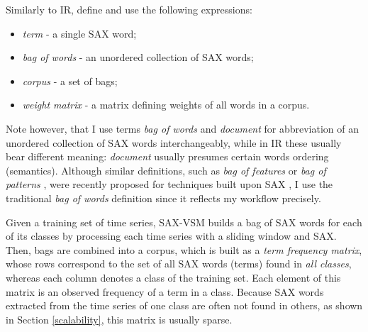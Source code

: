 Similarly to IR, define and use the following expressions:
\begin{itemize}
  \item \textit{term} - a single SAX word;
  \item \textit{bag of words} - an unordered collection of SAX words;
  \item \textit{corpus} - a set of bags;
  \item \textit{weight matrix} - a matrix defining weights of all words in a corpus.
\end{itemize}
Note however, that I use terms \textit{bag of words} and \textit{document} for abbreviation of an unordered 
collection of SAX words interchangeably, while in IR these usually bear different meaning: \textit{document} 
usually presumes certain words ordering (semantics). 
Although similar definitions, such as \textit{bag of features} \cite{citeulike:12636726} 
or \textit{bag of patterns} \cite{citeulike:10525778}, were recently proposed for techniques built 
upon SAX \cite{citeulike:10525778}, I use the traditional \textit{bag of words} definition since it reflects 
my workflow precisely. 

Given a training set of time series, SAX-VSM builds a bag of SAX words for each of its classes by processing 
each time series with a sliding window and SAX. Then, bags are combined into a corpus, which is built as a 
\textit{term frequency matrix}, whose rows correspond to the set of all SAX words (terms) 
found in \textit{all classes}, whereas each column denotes a class of the training set. 
Each element of this matrix is an observed frequency of a term in a class. 
Because SAX words extracted from the time series of one class are often not 
found in others, as shown in Section \ref{scalability}, this matrix is usually sparse. 

